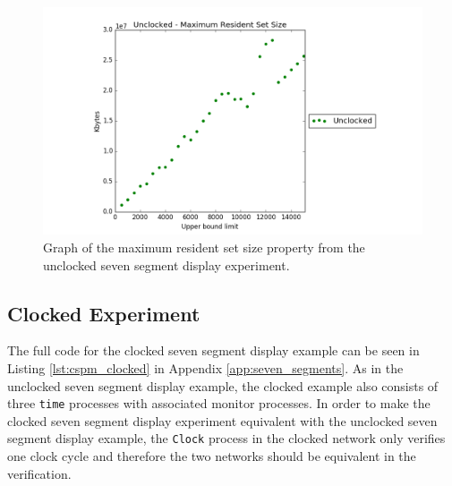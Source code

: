 \begin{figure}
    \centering
    \includegraphics[scale=0.6]{./figures/plots/unclocked_size.png}
\caption{Graph of the maximum resident set size property from the unclocked seven segment display experiment.}
\label{fig:unclocked_resident_size}
\end{figure}

\subsection{Clocked Experiment}
The full code for the clocked seven segment display example can be seen in Listing \ref{lst:cspm_clocked} in Appendix \ref{app:seven_segments}.
As in the unclocked seven segment display example, the clocked example also consists of three \texttt{time} processes with associated monitor processes.
In order to make the clocked seven segment display experiment equivalent with the unclocked seven segment display example, the \texttt{Clock} process in the clocked network only verifies one clock cycle and therefore the two networks should be equivalent in the verification.
